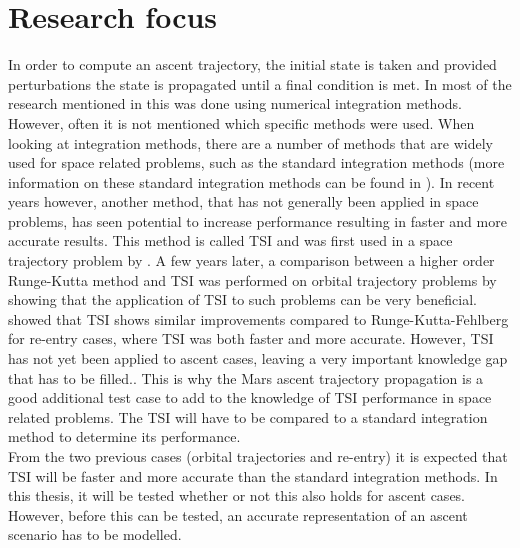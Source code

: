 \section{Research focus}
\label{sec:researchFocus}
In order to compute an ascent trajectory, the initial state is taken and provided perturbations the state is propagated until a final condition is met. In most of the research mentioned in  this was done using numerical integration methods. However, often it is not mentioned which specific methods were used. When looking at integration methods, there are a number of methods that are widely used for space related problems, such as the standard integration methods (more information on these standard integration methods can be found in ). In recent years however, another method, that has not generally been applied in space problems, has seen potential to increase performance resulting in faster and more accurate results. This method is called \acf{TSI} and was first used in a space trajectory problem by \cite{montenbruck1992numerical}. A few years later, a comparison between a higher order Runge-Kutta method and \ac{TSI} was performed on orbital trajectory problems by \cite{scott2008high} showing that the application of \ac{TSI} to such problems can be very beneficial. \cite{bergsma2016application} showed that \ac{TSI} shows similar improvements compared to Runge-Kutta-Fehlberg for re-entry cases, where \ac{TSI} was both faster and more accurate. However, \ac{TSI} has not yet been applied to ascent cases, leaving a very important knowledge gap that has to be filled.. This is why the Mars ascent trajectory propagation is a good additional test case to add to the knowledge of \ac{TSI} performance in space related problems. The \ac{TSI} will have to be compared to a standard integration method to determine its performance. \\
From the two previous cases (orbital trajectories and re-entry) it is expected that \ac{TSI} will be faster and more accurate than the standard integration methods. In this thesis, it will be tested whether or not this also holds for ascent cases. However, before this can be tested, an accurate representation of an ascent scenario has to be modelled. 
 


